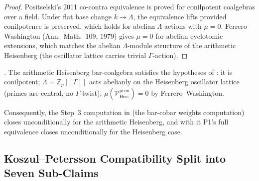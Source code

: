 \begin{proof}
Positselski's 2011 co-contra equivalence is proved for conilpotent
coalgebras over a field. Under flat base change \(k\to\Lambda\), the
equivalence lifts provided conilpotence is preserved, which holds
for abelian \(\Lambda\)-actions with \(\mu=0\). Ferrero--Washington
(Ann.~Math.~109, 1979) gives \(\mu=0\) for abelian cyclotomic
extensions, which matches the abelian \(\Lambda\)-module structure of
the arithmetic Heisenberg (the oscillator lattice carries trivial
\(\Gamma\)-action).
\end{proof}

\begin{corollary}
\label{v4-arith:sw:cor:PosAr-Heis-applies}
\ClaimStatusProvedHere. The arithmetic Heisenberg bar-coalgebra
satisfies the hypotheses of
: it is conilpotent;
\(\Lambda=\mathbb{Z}_{p}[[\Gamma]]\) acts abelianly on the
Heisenberg oscillator lattice (primes are central, no \(\Gamma\)-twist);
\(\mu(\mathcal{V}^{\mathrm{prim}}_{\mathrm{Heis}})=0\) by
Ferrero--Washington.
\end{corollary}

Consequently, the Step~3 computation in
 (the bar-cobar weights computation)
closes unconditionally for the arithmetic Heisenberg, and with it
P1's full equivalence closes unconditionally for the Heisenberg
case.

\subsection{Koszul--Petersson Compatibility Split into Seven Sub-Claims}

